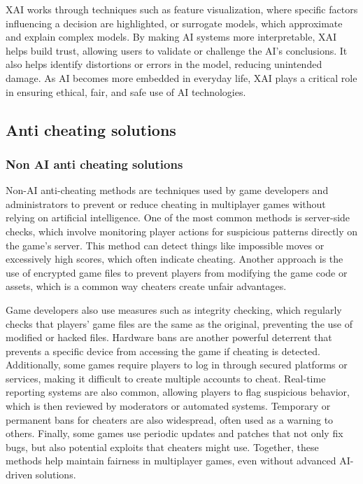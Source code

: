 XAI works through techniques such as feature visualization, where specific factors influencing a decision are highlighted, or surrogate models, which approximate and explain complex models. By making AI systems more interpretable, XAI helps build trust, allowing users to validate or challenge the AI's conclusions. It also helps identify distortions or errors in the model, reducing unintended damage. As AI becomes more embedded in everyday life, XAI plays a critical role in ensuring ethical, fair, and safe use of AI technologies.

\subsection{Anti cheating solutions}

\subsubsection{Non AI anti cheating solutions}

Non-AI anti-cheating methods are techniques used by game developers and administrators to prevent or reduce cheating in multiplayer games without relying on artificial intelligence. One of the most common methods is server-side checks, which involve monitoring player actions for suspicious patterns directly on the game's server. This method can detect things like impossible moves or excessively high scores, which often indicate cheating. Another approach is the use of encrypted game files to prevent players from modifying the game code or assets, which is a common way cheaters create unfair advantages.

Game developers also use measures such as integrity checking, which regularly checks that players' game files are the same as the original, preventing the use of modified or hacked files. Hardware bans are another powerful deterrent that prevents a specific device from accessing the game if cheating is detected. Additionally, some games require players to log in through secured platforms or services, making it difficult to create multiple accounts to cheat. Real-time reporting systems are also common, allowing players to flag suspicious behavior, which is then reviewed by moderators or automated systems. Temporary or permanent bans for cheaters are also widespread, often used as a warning to others. Finally, some games use periodic updates and patches that not only fix bugs, but also potential exploits that cheaters might use. Together, these methods help maintain fairness in multiplayer games, even without advanced AI-driven solutions.

